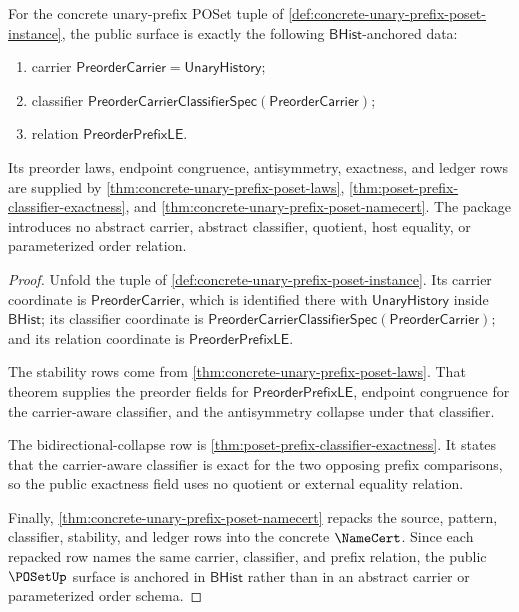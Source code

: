 \begin{theorem}
\label{thm:poset-public-prefix-closure-boundary}
For the concrete unary-prefix POSet tuple of
\autoref{def:concrete-unary-prefix-poset-instance}, the public surface is
exactly the following $\mathsf{BHist}$-anchored data:
\begin{enumerate}
  \item carrier $\mathsf{PreorderCarrier}=\mathsf{UnaryHistory}$;
  \item classifier
  $\mathsf{PreorderCarrierClassifierSpec}(\mathsf{PreorderCarrier})$;
  \item relation $\mathsf{PreorderPrefixLE}$.
\end{enumerate}
Its preorder laws, endpoint congruence, antisymmetry, exactness, and ledger
rows are supplied by
\autoref{thm:concrete-unary-prefix-poset-laws},
\autoref{thm:poset-prefix-classifier-exactness}, and
\autoref{thm:concrete-unary-prefix-poset-namecert}. The package introduces no
abstract carrier, abstract classifier, quotient, host equality, or
parameterized order relation.
\end{theorem}
\begin{proof}
Unfold the tuple of
\autoref{def:concrete-unary-prefix-poset-instance}. Its carrier coordinate is
$\mathsf{PreorderCarrier}$, which is identified there with
$\mathsf{UnaryHistory}$ inside $\mathsf{BHist}$; its classifier coordinate is
$\mathsf{PreorderCarrierClassifierSpec}(\mathsf{PreorderCarrier})$; and its
relation coordinate is $\mathsf{PreorderPrefixLE}$.

The stability rows come from
\autoref{thm:concrete-unary-prefix-poset-laws}. That theorem supplies the
preorder fields for $\mathsf{PreorderPrefixLE}$, endpoint congruence for the
carrier-aware classifier, and the antisymmetry collapse under that classifier.

The bidirectional-collapse row is
\autoref{thm:poset-prefix-classifier-exactness}. It states that the
carrier-aware classifier is exact for the two opposing prefix comparisons, so
the public exactness field uses no quotient or external equality relation.

Finally, \autoref{thm:concrete-unary-prefix-poset-namecert} repacks the source,
pattern, classifier, stability, and ledger rows into the concrete $\NameCert$.
Since each repacked row names the same carrier, classifier, and prefix
relation, the public $\POSetUp$ surface is anchored in $\mathsf{BHist}$ rather
than in an abstract carrier or parameterized order schema.
\end{proof}

